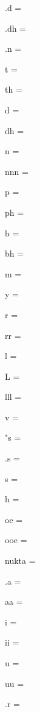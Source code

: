 \documentclass{article}
\begin{document}
\begin{multicols}{6}
\noindent .d = {\fdeva {}}\par
\noindent .dh = {\fdeva {}}\par
\noindent .n = {\fdeva {}}\par
\noindent t = {\fdeva {}}\par
\noindent th = {\fdeva {}}\par
\noindent d = {\fdeva {}}\par
\noindent dh = {\fdeva {}}\par
\noindent n = {\fdeva {}}\par
\noindent nnn = {\fdeva {}}\par
\noindent p = {\fdeva {}}\par
\noindent ph = {\fdeva {}}\par
\noindent b = {\fdeva {}}\par
\noindent bh = {\fdeva {}}\par
\noindent m = {\fdeva {}}\par
\noindent y = {\fdeva {}}\par
\noindent r = {\fdeva {}}\par
\noindent rr = {\fdeva {}}\par
\noindent l = {\fdeva {}}\par
\noindent L = {\fdeva {}}\par
\noindent lll = {\fdeva {}}\par
\noindent v = {\fdeva {}}\par
\noindent "s = {\fdeva {}}\par
\noindent .s = {\fdeva {}}\par
\noindent s = {\fdeva {}}\par
\noindent h = {\fdeva {}}\par
\noindent oe = {\fdeva {}}\par
\noindent ooe = {\fdeva {}}\par
\noindent nukta = {\fdeva {}}\par
\noindent .a = {\fdeva {}}\par
\noindent aa = {\fdeva {}}\par
\noindent i = {\fdeva {}}\par
\noindent ii = {\fdeva {}}\par
\noindent u = {\fdeva {}}\par
\noindent uu = {\fdeva {}}\par
\noindent .r = {\fdeva {}}\par

\end{multicols}
\end{document}
